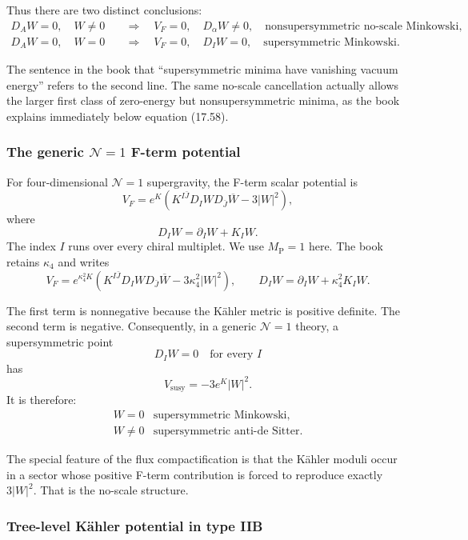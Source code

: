 \documentclass[
  10pt,
  a4paper,
  openany]{book}
\begin{document}
Thus there are two distinct conclusions: \[
\boxed{
\begin{aligned}
D_AW=0,\quad W\neq0
&\quad\Longrightarrow\quad
V_F=0,\quad D_\alpha W\neq0,
\quad\text{nonsupersymmetric no-scale Minkowski},\\[1mm]
D_AW=0,\quad W=0
&\quad\Longrightarrow\quad
V_F=0,\quad D_IW=0,
\quad\text{supersymmetric Minkowski}.
\end{aligned}
}
\]

The sentence in the book that ``supersymmetric minima have vanishing
vacuum energy'' refers to the second line. The same no-scale
cancellation actually allows the larger first class of zero-energy but
nonsupersymmetric minima, as the book explains immediately below
equation (17.58).

\subsubsection{\texorpdfstring{The generic \(\mathcal N=1\) F-term
potential}{The generic \textbackslash mathcal N=1 F-term potential}}\label{the-generic-mathcal-n1-f-term-potential}

For four-dimensional \(\mathcal N=1\) supergravity, the F-term scalar
potential is \[
V_F
=e^K\left(
K^{I\bar J}D_IW D_{\bar J}\overline W
-3|W|^2
\right),
\] where \[
D_IW=\partial_IW+K_IW.
\] The index \(I\) runs over every chiral multiplet. We use
\(M_{\mathrm P}=1\) here. The book retains \(\kappa_4\) and writes \[
V_F
=e^{\kappa_4^2K}\left(
K^{I\bar J}D_IW D_{\bar J}\overline W
-3\kappa_4^2|W|^2
\right),
\qquad
D_IW=\partial_IW+\kappa_4^2K_IW.
\]

The first term is nonnegative because the Kähler metric is positive
definite. The second term is negative. Consequently, in a generic
\(\mathcal N=1\) theory, a supersymmetric point \[
D_IW=0\quad\text{for every }I
\] has \[
V_{\mathrm{susy}}=-3e^K|W|^2.
\] It is therefore: \[
\begin{array}{c|c}
W=0 & \text{supersymmetric Minkowski},\\
W\neq0 & \text{supersymmetric anti-de Sitter}.
\end{array}
\]

The special feature of the flux compactification is that the Kähler
moduli occur in a sector whose positive F-term contribution is forced to
reproduce exactly \(3|W|^2\). That is the no-scale structure.

\subsubsection{Tree-level Kähler potential in type
IIB}\label{tree-level-kuxe4hler-potential-in-type-iib}
\end{document}
